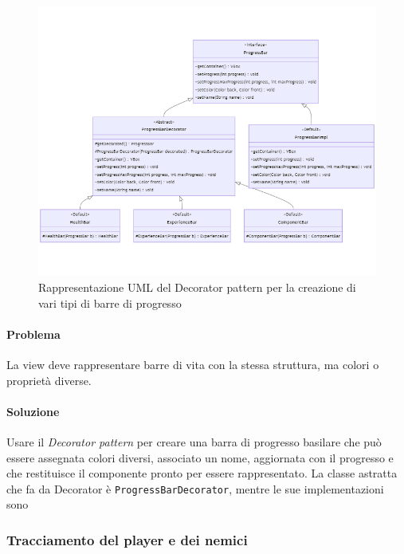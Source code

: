 \documentclass[a4paper,12pt]{report}
\begin{document}
\begin{figure}[H]
	\centering{}
	\includegraphics[width=\textwidth]{img/ProgressBar.png}
	\caption{Rappresentazione UML del Decorator pattern per la creazione di vari tipi di barre di progresso}
	\label{img:ProgressBar}
\end{figure}

\paragraph{Problema} La view deve rappresentare barre di vita con la stessa struttura, ma colori o proprietà diverse.
\paragraph{Soluzione} Usare il \textit{Decorator pattern} per creare una barra di progresso basilare che può essere assegnata colori diversi, associato un nome, aggiornata con il progresso e che restituisce il componente pronto per essere rappresentato. La classe astratta che fa da Decorator è \texttt{ProgressBarDecorator}, mentre le sue implementazioni sono 

\subsubsection*{Tracciamento del player e dei nemici}
\end{document}
